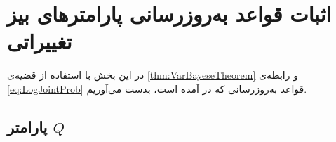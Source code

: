 ﻿%

\section{اثبات قواعد به‌روزرسانی پارامترهای بیز تغییراتی}
\label{app:VBUpdatingRules}


در این بخش با استفاده از قضیه‌ی
\ref{thm:VarBayeseTheorem}
و رابطه‌ی
\eqref{eq:LogJointProb}
قواعد به‌روز‌رسانی که در
\cite{fastStructure}
آمده است، بدست می‌آوریم.


\subsection{پارامتر
$Q$}

